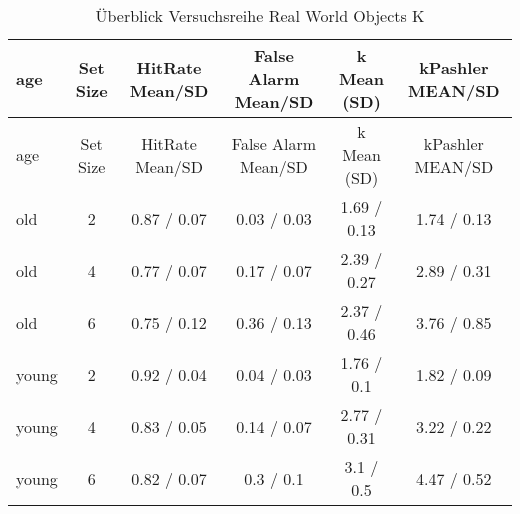 \documentclass[
]{article}
\begin{document}
\begin{longtable}[]{@{}lccccc@{}}
\caption{Überblick Versuchsreihe Real World Objects K}\tabularnewline
\toprule
age & Set Size & HitRate Mean/SD & False Alarm Mean/SD & k Mean (SD) &
kPashler MEAN/SD\tabularnewline
\midrule
\endfirsthead
\toprule
age & Set Size & HitRate Mean/SD & False Alarm Mean/SD & k Mean (SD) &
kPashler MEAN/SD\tabularnewline
\midrule
\endhead
old & 2 & 0.87 / 0.07 & 0.03 / 0.03 & 1.69 / 0.13 & 1.74 /
0.13\tabularnewline
old & 4 & 0.77 / 0.07 & 0.17 / 0.07 & 2.39 / 0.27 & 2.89 /
0.31\tabularnewline
old & 6 & 0.75 / 0.12 & 0.36 / 0.13 & 2.37 / 0.46 & 3.76 /
0.85\tabularnewline
young & 2 & 0.92 / 0.04 & 0.04 / 0.03 & 1.76 / 0.1 & 1.82 /
0.09\tabularnewline
young & 4 & 0.83 / 0.05 & 0.14 / 0.07 & 2.77 / 0.31 & 3.22 /
0.22\tabularnewline
young & 6 & 0.82 / 0.07 & 0.3 / 0.1 & 3.1 / 0.5 & 4.47 /
0.52\tabularnewline
\bottomrule
\end{longtable}
\end{document}
